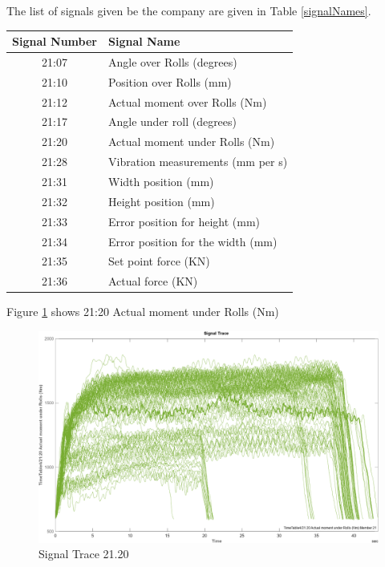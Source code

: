 \documentclass{article}
\begin{document}
The list of signals given be the company are given in Table \ref{signalNames}.
\begin{center}
\begin{tabular}{ |c|l| }
 \hline
 Signal Number & Signal Name \\ 
 \hline
21:07 & Angle over Rolls (degrees) \\
 \hline
21:10 & Position over Rolls (mm) \\
 \hline
21:12 & Actual moment over Rolls (Nm) \\
 \hline
21:17 & Angle under roll (degrees) \\
 \hline
21:20 & Actual moment under Rolls (Nm) \\
 \hline
21:28 & Vibration measurements (mm per s) \\ 
 \hline              
21:31 & Width position (mm) \\
 \hline
21:32 & Height position (mm) \\
 \hline
21:33 & Error position for height (mm) \\
 \hline
21:34 & Error position for the width (mm) \\
 \hline
21:35 & Set point force (KN) \\
 \hline
21:36 & Actual force (KN) \\
 \hline
\end{tabular}
\label{signalNames}
\end{center}

Figure \ref{fig:SignalTrace21.20} shows 21:20 Actual moment under Rolls (Nm)

\begin{figure}[!ht]
    \centering
    \includegraphics[width=\textwidth, height=\textheight, keepaspectratio]{figures/SignalTrace21.20.png}
    \caption{Signal Trace 21.20}
    \label{fig:SignalTrace21.20}
\end{figure}
\end{document}
